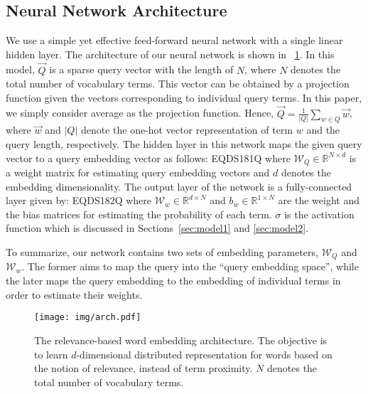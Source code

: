 \documentclass[sigconf]{acmart}
\begin{document}
\subsection{Neural Network Architecture}
\label{sec:nn}
We use a simple yet effective feed-forward neural network with a single linear hidden layer. The architecture of our neural network is shown in \figurename~\ref{fig:arch}. In this model, $\vec{Q}$ is a sparse query vector with the length of $N$, where $N$ denotes the total number of vocabulary terms. This vector can be obtained by a projection function given the vectors corresponding to individual query terms. In this paper, we simply consider average as the projection function. Hence, $\vec{Q} = \frac{1}{|Q|} \sum_{w \in Q}{\vec{w}}$, where $\vec{w}$ and $|Q|$ denote the one-hot vector representation of term $w$ and the query length, respectively. The hidden layer in this network maps the given query vector to a query embedding vector as follows:
EQDS181Q
where $\mathcal{W}_Q \in \mathbb{R}^{N \times d}$ is a weight matrix for estimating query embedding vectors and $d$ denotes the embedding dimensionality. The output layer of the network is a fully-connected layer given by:
EQDS182Q
where $\mathcal{W}_w \in \mathbb{R}^{d \times N}$ and $b_w \in \mathbb{R}^{1 \times N}$ are the weight and the bias matrices for estimating the probability of each term. $\sigma$ is the activation function which is discussed in Sections~\ref{sec:model1} and \ref{sec:model2}.

To summarize, our network contains two sets of embedding parameters, $\mathcal{W}_Q$ and $\mathcal{W}_w$. The former aims to map the query into the ``query embedding space'', while the later maps the query embedding to the embedding of individual terms in order to estimate their weights. 

\begin{figure}
    \centering
    \vspace{-0.2cm}
    \texttt{[image: img/arch.pdf]}
    \caption{The relevance-based word embedding architecture. The objective is to learn $d$-dimensional distributed representation for words based on the notion of relevance, instead of term proximity. $N$ denotes the total number of vocabulary terms.}
    \vspace{-0.3cm}
    \label{fig:arch}
\end{figure}
\end{document}
